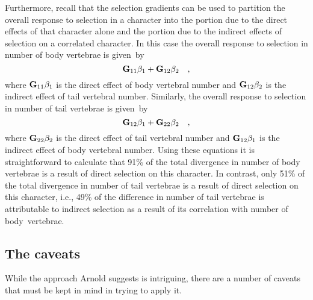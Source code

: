 Furthermore, recall that the selection gradients can be used to
partition the overall response to selection in a character into the
portion due to the direct effects of that character alone and the
portion due to the indirect effects of selection on a correlated
character. In this case the overall response to selection in number of
body vertebrae is given~by
\[
{\bf G}_{11}\beta_1 + {\bf G}_{12}\beta_2 \quad ,
\]
where ${\bf G}_{11}\beta_1$ is the direct effect of body vertebral
number and ${\bf G}_{12}\beta_2$ is the indirect effect of tail
vertebral number. Similarly, the overall response to selection in
number of tail vertebrae is given~by
\[
{\bf G}_{12}\beta_1 + {\bf G}_{22}\beta_2 \quad ,
\]
where ${\bf G}_{22}\beta_2$ is the direct effect of tail vertebral
number and ${\bf G}_{12}\beta_1$ is the indirect effect of body
vertebral number. Using these equations it is straightforward to
calculate that 91\% of the total divergence in number of body
vertebrae is a result of direct selection on this character. In
contrast, only 51\% of the total divergence in number of tail
vertebrae is a result of direct selection on this character, i.e.,
49\% of the difference in number of tail vertebrae is attributable to
indirect selection as a result of its correlation with number of
body~vertebrae.

\subsection*{The caveats}

While the approach Arnold suggests is intriguing, there are a number
of caveats that must be kept in mind in trying to apply it.


